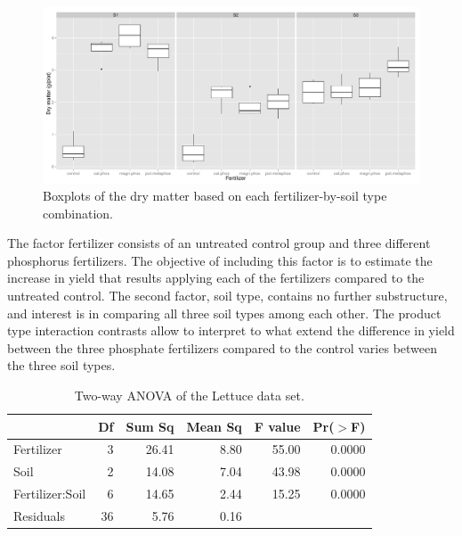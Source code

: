 \documentclass[12pt]{article}\usepackage[]{graphicx}\usepackage[]{color}
\makeatletter
\def\maxwidth{ %
  \ifdim\Gin@nat@width>\linewidth
    \linewidth
  \else
    \Gin@nat@width
  \fi
}
\newenvironment{knitrout}{}{} %
\makeatother
\begin{document}
\begin{knitrout}
\color{fgcolor}\begin{figure}[]

\includegraphics[width=\maxwidth]{figure/chunk32} \caption[Boxplots of the dry matter based on each fertilizer-by-soil type combination]{Boxplots of the dry matter based on each fertilizer-by-soil type combination.\label{fig:chunk32}}
\end{figure}


\end{knitrout}


The factor fertilizer consists of
an untreated control group and three different phosphorus fertilizers. The objective of including this factor is to
estimate the increase in yield that results applying each of the fertilizers compared to the untreated
control. The second factor, soil type, contains no
further substructure, and interest is in comparing all three soil types among each other. The product type interaction contrasts allow to
interpret to what extend the difference in yield between the three phosphate fertilizers compared to
the control varies between the three soil types.

\begin{table}[ht]
\centering
\begin{tabular}{lrrrrr}
  \hline
 & Df & Sum Sq & Mean Sq & F value & Pr($>$F) \\ 
  \hline
Fertilizer & 3 & 26.41 & 8.80 & 55.00 & 0.0000 \\ 
  Soil & 2 & 14.08 & 7.04 & 43.98 & 0.0000 \\ 
  Fertilizer:Soil & 6 & 14.65 & 2.44 & 15.25 & 0.0000 \\ 
  Residuals & 36 & 5.76 & 0.16 &  &  \\ 
   \hline
\end{tabular}
\caption{Two-way ANOVA of the Lettuce data set.} 
\end{table}
\end{document}
